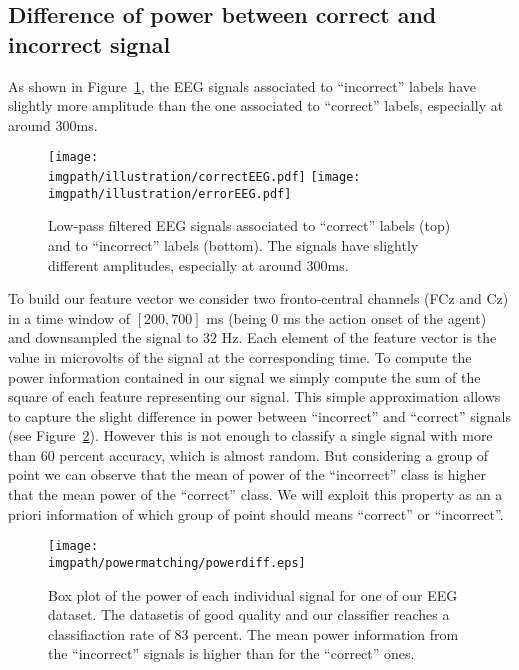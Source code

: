 \subsection{Difference of power between correct and incorrect signal}

As shown in Figure~\ref{fig:EEGsample}, the EEG signals associated to ``incorrect'' labels have slightly more amplitude than the one associated to ``correct'' labels, especially at around 300ms.

\begin{figure}[!htbp]
\centering
\texttt{[image: \\imgpath/illustration/correctEEG.pdf]}
\texttt{[image: \\imgpath/illustration/errorEEG.pdf]}
\caption{Low-pass filtered EEG signals associated to ``correct'' labels (top) and to ``incorrect'' labels (bottom).  The signals have slightly different amplitudes, especially at around 300ms. }
\label{fig:EEGsample}
\end{figure}

To build our feature vector we consider two fronto-central channels (FCz and Cz) in a time window of $[200,700]$ ms (being 0 ms the action onset of the agent) and downsampled the signal to $32$ Hz. Each element of the feature vector is the value in microvolts of the signal at the corresponding time. To compute the power information contained in our signal we simply compute the sum of the square of each feature representing our signal. This simple approximation allows to capture the slight difference in power between ``incorrect'' and ``correct'' signals (see Figure~\ref{fig:EEGpower}). However this is not enough to classify a single signal with more than 60 percent accuracy, which is almost random. But considering a group of point we can observe that the mean of power of the ``incorrect'' class is higher that the mean power of the ``correct'' class. We will exploit this property as an a priori information of which group of point should means ``correct'' or ``incorrect''.

\begin{figure}[!htbp]
\centering
\texttt{[image: \\imgpath/powermatching/powerdiff.eps]}
\caption{Box plot of the power of each individual signal for one of our EEG dataset. The datasetis of good quality and our classifier reaches a classifiaction rate of 83 percent. The mean power information from the ``incorrect'' signals is higher than for the ``correct'' ones.}
\label{fig:EEGpower}
\end{figure} 


